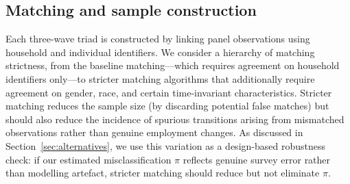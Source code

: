 \subsection{Matching and sample construction}\label{subsec:matching}

Each three-wave triad is constructed by linking panel observations using
household and individual identifiers. We consider a hierarchy of matching
strictness, from the baseline matching---which requires agreement on household
identifiers only---to stricter matching algorithms that additionally require
agreement on gender, race, and certain time-invariant characteristics. Stricter
matching reduces the sample size (by discarding potential false matches) but
should also reduce the incidence of spurious transitions arising from
mismatched observations rather than genuine employment changes. As discussed
in Section~\ref{sec:alternatives}, we use this variation as a design-based
robustness check: if our estimated misclassification $\pi$ reflects genuine
survey error rather than modelling artefact, stricter matching should reduce
but not eliminate $\pi$.
